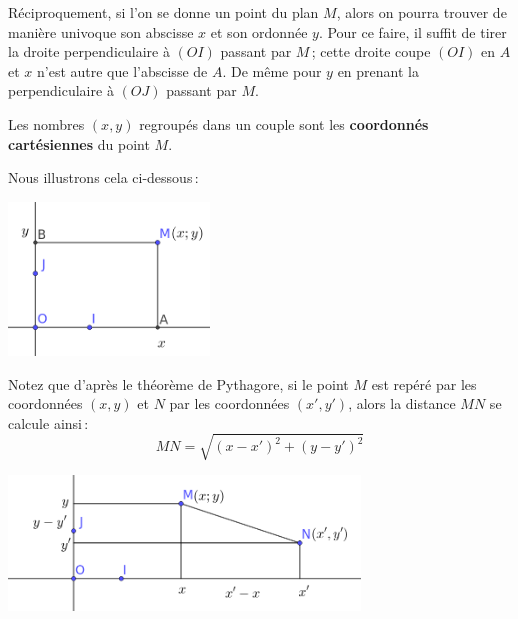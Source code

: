 			Réciproquement, si l'on se donne un point du plan $M$, alors on pourra trouver de manière univoque son abscisse $x$ et son ordonnée $y$. Pour ce faire, il suffit de tirer la droite perpendiculaire à $(OI)$ passant par $M$\,; cette droite coupe $(OI)$ en $A$ et $x$ n'est autre que l'abscisse de $A$. De même pour $y$ en prenant la perpendiculaire à $(OJ)$ passant par $M$.

			Les nombres $(x,y)$ regroupés dans un couple sont les {\bfseries coordonnés cartésiennes} du point $M$.

			Nous  illustrons cela ci-dessous\,:

			\vspace{0.2cm}

			\includegraphics[width=0.4\textwidth]{image/calcul/point2d.png}			

			Notez que d'après le théorème de Pythagore, si le point $M$ est repéré par les coordonnées $(x,y)$ et $N$ par les coordonnées $(x',y')$, alors la distance $MN$ se calcule ainsi\,:
			\begin{equation}
				MN=\sqrt{(x-x')^2+(y-y')^2}
			\end{equation}

			\includegraphics[width=0.7\textwidth]{image/calcul/point2dpyth.png}


